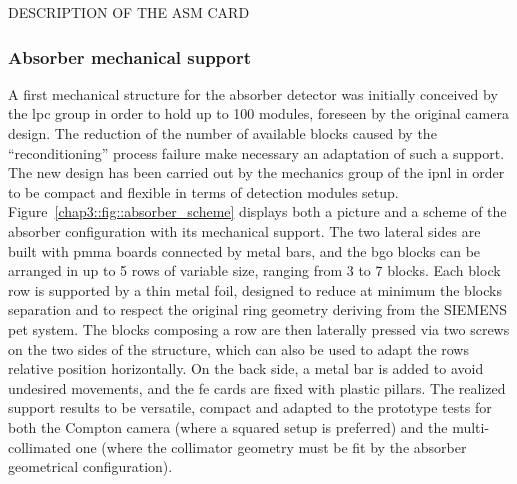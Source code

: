 DESCRIPTION OF THE ASM CARD

\subsubsection{Absorber mechanical support}\label{chap3::subsubsec::AbsorberMechanics}

A first mechanical structure for the absorber detector was initially conceived by the \gls{lpc} group in order to hold up to 100 modules, foreseen by the original camera design. The reduction of the number of available blocks caused by the \enquote{reconditioning} process failure make necessary an adaptation of such a support. The new design has been carried out by the mechanics group of the \gls{ipnl} in order to be compact and flexible in terms of detection modules setup. Figure~\ref{chap3::fig::absorber_scheme} displays both a picture and a scheme of the absorber configuration with its mechanical support. The two lateral sides are built with \gls{pmma} boards connected by metal bars, and the \gls{bgo} blocks can be arranged in up to 5 rows of variable size, ranging from 3 to 7 blocks. Each block row is supported by a thin metal foil, designed to reduce at minimum the blocks separation and to respect the original ring geometry deriving from the SIEMENS \gls{pet} system. The blocks composing a row are then laterally pressed via two screws on the two sides of the structure, which can also be used to adapt the rows relative position horizontally. On the back side, a metal bar is added to avoid undesired movements, and the \gls{fe} cards are fixed with plastic pillars. The realized support results to be versatile, compact and adapted to the prototype tests for both the Compton camera (where a squared setup is preferred) and the multi-collimated one (where the collimator geometry must be fit by the absorber geometrical configuration).       

